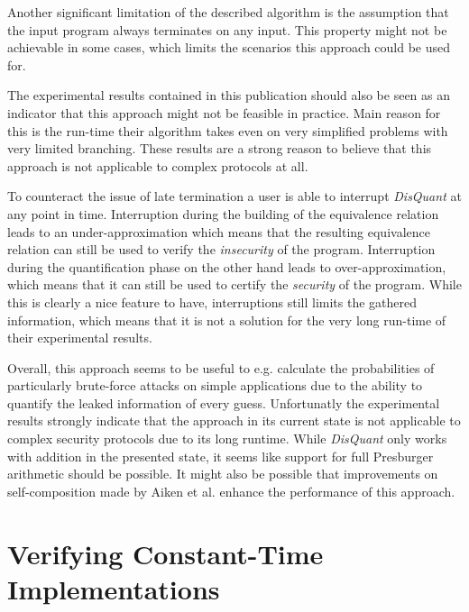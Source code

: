 \documentclass[a4paper,UKenglish]{lipics-v2018}
\begin{document}
Another significant limitation of the described algorithm is the assumption that the input program always terminates on any input. This property might not be achievable in some cases, which limits the scenarios this approach could be used for.

The experimental results contained in this publication should also be seen as an indicator that this approach might not be feasible in practice. Main reason for this is the run-time their algorithm takes even on very simplified problems with very limited branching. These results are a strong reason to believe that this approach is not applicable to complex protocols at all.
\cite{automatic_discovery_and_quantification}

To counteract the issue of late termination a user is able to interrupt \textit{DisQuant} at any point in time. Interruption during the building of the equivalence relation leads to an under-approximation which means that the resulting equivalence relation can still be used to verify the \textit{insecurity} of the program. Interruption during the quantification phase on the other hand leads to over-approximation, which means that it can still be used to certify the \textit{security} of the program. While this is clearly a nice feature to have, interruptions still limits the gathered information, which means that it is not a solution for the very long run-time of their experimental results.
\cite{automatic_discovery_and_quantification}

Overall, this approach seems to be useful to e.g. calculate the probabilities of particularly brute-force attacks on simple applications due to the ability to quantify the leaked information of every guess. Unfortunatly the experimental results strongly indicate that the approach in its current state is not applicable to complex security protocols due to its long runtime. While \textit{DisQuant} only works with addition in the presented state, it seems like support for full Presburger  arithmetic should be possible. It might also be possible that improvements on self-composition made by Aiken et al. enhance the performance of this approach.\cite{secure_information_flow_safety}



\section{Verifying Constant-Time Implementations}
\end{document}
